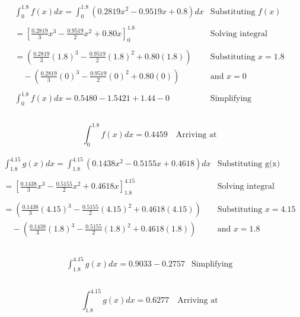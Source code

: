 \documentclass[12pt]{article}
\begin{document}
$$
\begin{array}{l|c}
    \int_0^{1.8}{f(x)}dx = \int_0^{1.8}{(0.2819x^2 -0.9519x +0.8)}dx & \text{Substituting } f(x) \\ \\
    = \left[   \frac{0.2819}{3}x^3 -  \frac{0.9519}{2}x^2 + 0.80x \right]_0^{1.8} & \text{Solving integral} \\ \\
    = (\frac{0.2819}{3}(1.8)^3 - \frac{0.9519}{2}(1.8)^2 + 0.80(1.8)) & \text{Substituting } x=1.8 \\
    \quad -(\frac{0.2819}{3}(0)^3 - \frac{0.9519}{2}(0)^2 + 0.80(0))  & \text{and } x=0 \\ \\
    \int_0^{1.8}{f(x)}dx = 0.5480 - 1.5421 + 1.44 -0 & \text{Simplifying} \\ \\
 \end{array}
$$

\begin{equation}\label{tsp.int.fx}
    \boxed{\int_0^{1.8}{f(x)}dx = 0.4459}  \quad \text{Arriving at}
\end{equation}

$$
\begin{array}{l|c}
   \int_{1.8}^{4.15}{g(x)}dx = \int_{1.8}^{4.15}{(0.1438x^2 -0.5155x + 0.4618)}dx & \text{Substituting g(x)} \\ \\
    = \left[   \frac{0.1438}{3}x^3 -  \frac{0.5155}{2}x^2 + 0.4618x \right]_{1.8}^{4.15} & \text{Solving integral} \\ \\
    = (\frac{0.1438}{3}(4.15)^3 - \frac{0.5155}{2}(4.15)^2 + 0.4618(4.15)) & \text{Substituting } x=4.15 \\ \quad -(\frac{0.1438}{3}(1.8)^3 - \frac{0.5155}{2}(1.8)^2 + 0.4618(1.8)) & \text{and } x=1.8 \\ \\
\end{array}
$$

$$
\begin{array}{l|c}
    \int_{1.8}^{4.15}{g(x)}dx = 0.9033 -0.2757 & \text{Simplifying} \\ \\
 \end{array}
$$

\begin{equation}\label{tsp.int.gx}
    \boxed{\int_{1.8}^{4.15}{g(x)}dx = 0.6277}  \quad \text{Arriving at}
\end{equation}
\end{document}
